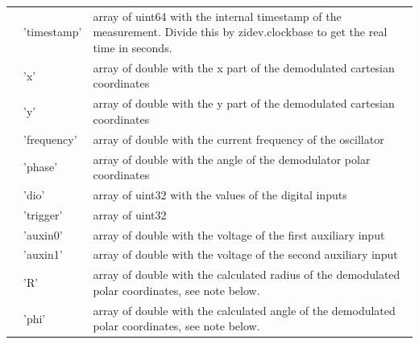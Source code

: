\documentclass[11pt]{article} %
\begin{document}
\begin{itemize}
	\begin{longtable}{p{1.5cm}p{3cm}p{12cm}}
	& 'timestamp' & array of uint64 with the internal timestamp of the measurement. Divide this by zidev.clockbase to get the real time in seconds. \\
	& 'x' & array of double with the x part of the demodulated cartesian coordinates \\
	& 'y' & array of double with the y part of the demodulated cartesian coordinates \\
	& 'frequency' & array of double with the current frequency of the oscillator \\
	& 'phase' & array of double with the angle of the demodulator polar coordinates \\
	& 'dio' & array of uint32 with the values of the digital inputs \\
	& 'trigger' & array of uint32 \\
	& 'auxin0' & array of double with the voltage of the first auxiliary input \\
	& 'auxin1' & array of double with the voltage of the second auxiliary input \\
	& 'R' & array of double with the calculated radius of the demodulated polar coordinates, see note below. \\
	& 'phi' & array of double with the calculated angle of the demodulated polar coordinates, see note below. \\
	\end{longtable}




\end{itemize}
\end{document}
